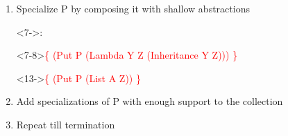 \documentclass{beamer}
\begin{document}
\begin{frame}[fragile]
{\begin{enumerate}
  \item Specialize P by \alert{composing} it with shallow abstractions\begin{onlyenv}<7->:\end{onlyenv}
      \begin{onlyenv}<7-8>\textcolor{red}{\{ (Put P (Lambda Y Z
          (Inheritance Y Z))) \}}
      \end{onlyenv}\begin{onlyenv}<13->\textcolor{red}{\{ (Put P
          (List A Z)) \}}
      \end{onlyenv}

  \item Add specializations of P with \alert{enough support} to the
    collection
  \item Repeat till termination
  \end{enumerate}}
\end{frame}
\end{document}
